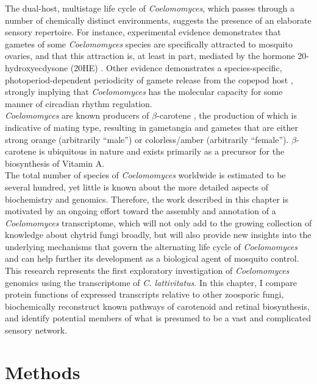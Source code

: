 \indent The dual-host, multistage life cycle of \textit{Coelomomyces}, which passes through a number of chemically distinct environments, suggests the presence of an elaborate sensory repertoire. For instance, experimental evidence demonstrates that gametes of some \textit{Coelomomyces} species are specifically attracted to mosquito ovaries, and that this attraction is, at least in part, mediated by the hormone 20-hydroxyecdysone (20HE) \cite{Lucarotti1992}. Other evidence demonstrates a species-specific, photoperiod-dependent periodicity of gamete release from the copepod host \cite{Federici1983}, strongly implying that \textit{Coelomomyces} has the molecular capacity for some manner of circadian rhythm regulation. \\
\indent \textit{Coelomomyces} are known producers of $\beta$-carotene \cite{Federici1979}, the production of which is indicative of mating type, resulting in gametangia and gametes that are either strong orange (arbitrarily \enquote{male}) or colorless/amber (arbitrarily \enquote{female}). $\beta$-carotene is ubiquitous in nature and exists primarily as a precursor for the biosynthesis of Vitamin A.\\
\indent The total number of species of \textit{Coelomomyces} worldwide is estimated to be several hundred, yet little is known about the more detailed aspects of biochemistry and genomics. Therefore, the work described in this chapter is motivated by an ongoing effort toward the assembly and annotation of a \textit{Coelomomyces} transcriptome, which will not only add to the growing collection of knowledge about chytrid fungi broadly, but will also provide new insights into the underlying mechanisms that govern the alternating life cycle of \textit{Coelomomyces} and can help further its development as a biological agent of mosquito control. \\
\indent This research represents the first exploratory investigation of \textit{Coelomomyces} genomics using the transcriptome of \textit{C. lattivitatus}. In this chapter, I compare protein functions of expressed transcripts relative to other zoosporic fungi, biochemically reconstruct known pathways of carotenoid and retinal biosynthesis, and identify potential members of what is presumed to be a vast and complicated sensory network. \\

\section{Methods}

